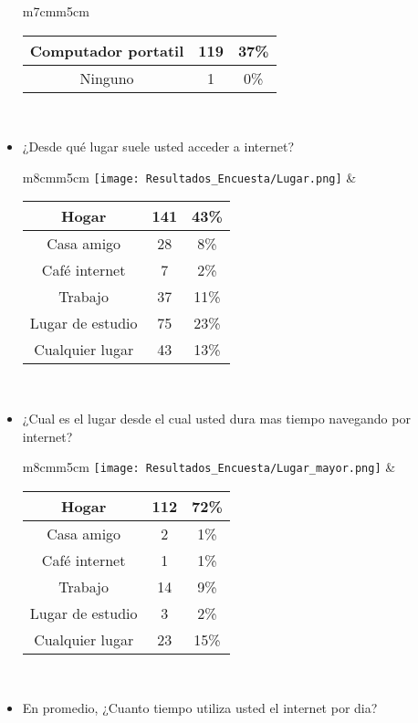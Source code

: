 \begin{itemize}
\begin{tabular}{m{7cm}m{5cm}}
\begin{tabular}{|c|cc|}
         Computador portatil & 119 & 37\% \\ \hline
         Ninguno & 1 & 0\% \\ \hline
        \end{tabular} \\
      \end{tabular}
  \item ¿Desde qué lugar suele usted acceder a internet? \\
      \begin{tabular}{m{8cm}m{5cm}}
        \texttt{[image: Resultados\_Encuesta/Lugar.png]} &
        \begin{tabular}{|c|cc|}
        \hline
         Hogar & 141 & 43\% \\ \hline
         Casa amigo & 28 & 8\% \\ \hline
         Café internet & 7 & 2\% \\ \hline
         Trabajo & 37 & 11\% \\ \hline
         Lugar de estudio & 75 & 23\% \\ \hline
         Cualquier lugar & 43 & 13\% \\ \hline
        \end{tabular} \\
      \end{tabular}
  \item ¿Cual es el lugar desde el cual usted dura mas tiempo navegando por internet? \\
      \begin{tabular}{m{8cm}m{5cm}}
        \texttt{[image: Resultados\_Encuesta/Lugar\_mayor.png]} &
        \begin{tabular}{|c|cc|}
        \hline
         Hogar & 112 & 72\% \\ \hline
         Casa amigo & 2 & 1\% \\ \hline
         Café internet & 1 & 1\% \\ \hline
         Trabajo & 14 & 9\% \\ \hline
         Lugar de estudio & 3 & 2\% \\ \hline
         Cualquier lugar & 23 & 15\% \\ \hline
        \end{tabular} \\
      \end{tabular}
  \item En promedio, ¿Cuanto tiempo utiliza usted el internet por dia? \\
      \begin{tabular}{m{10cm}m{5cm}}

\end{tabular}
\end{itemize}
